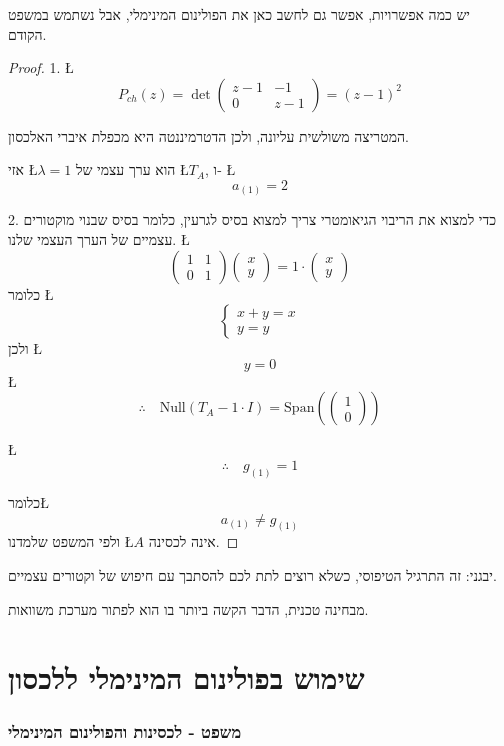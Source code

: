 \documentclass[english,hebrew]{article}
\begin{document}
יש כמה אפשרויות, אפשר גם לחשב כאן את הפולינום המינימלי, אבל נשתמש
במשפט הקודם.
\begin{proof}
1. \L{%
\[
P_{ch}(z)=\det\begin{pmatrix}z-1 & -1\\
0 & z-1
\end{pmatrix}=(z-1)^{2}
\]
}%

המטריצה משולשית עליונה, ולכן הדטרמיננטה היא מכפלת איברי האלכסון.

אזי \L{$\lambda=1$} הוא ערך עצמי של \L{$T_{A}$}, ו- \L{%
\[
a_{\left(1\right)}=2
\]
}%

2. כדי למצוא את הריבוי הגיאומטרי צריך למצוא בסיס לגרעין, כלומר בסיס
שבנוי מוקטורים עצמיים של הערך העצמי שלנו. \L{%
\[
\begin{pmatrix}1 & 1\\
0 & 1
\end{pmatrix}\begin{pmatrix}x\\
y
\end{pmatrix}=1\cdot\begin{pmatrix}x\\
y
\end{pmatrix}
\]
}%
כלומר \L{%
\[
\begin{cases}
x+y=x\\
y=y
\end{cases}
\]
}%
ולכן \L{%
\[
y=0
\]
}%
\L{%
\[
\therefore\quad\text{Null}(T_{A}-1\cdot I)=\text{Span}\left(\begin{pmatrix}1\\
0
\end{pmatrix}\right)
\]
}%

\L{%
\[
\therefore\quad g_{\left(1\right)}=1
\]
}%

כלומר\L{%
\[
a_{\left(1\right)}\neq g_{\left(1\right)}
\]
}%
ולפי המשפט שלמדנו \L{$A$} אינה לכסינה.
\end{proof}
יבגני: זה התרגיל הטיפוסי, כשלא רוצים לתת לכם להסתבך עם חיפוש של וקטורים
עצמיים.

מבחינה טכנית, הדבר הקשה ביותר בו הוא לפתור מערכת משוואות.

\part{שימוש בפולינום המינימלי ללכסון}

\section{משפט - לכסינות והפולינום המינימלי}
\end{document}
